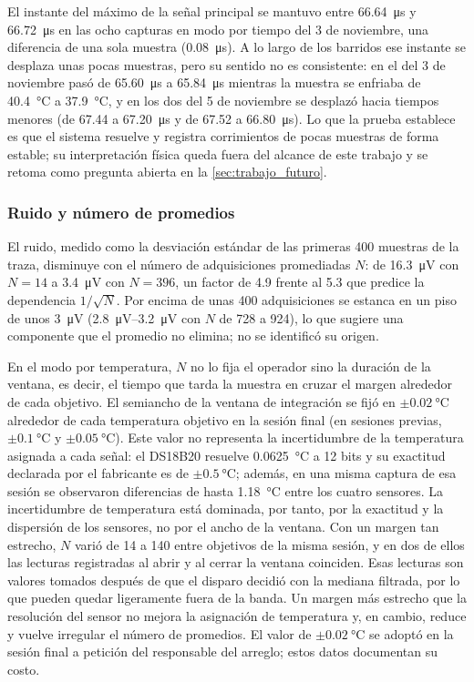 El instante del máximo de la señal principal se mantuvo entre
\SI{66.64}{\micro\second} y \SI{66.72}{\micro\second} en las ocho
capturas en modo por tiempo del 3 de noviembre, una diferencia de una
sola muestra (\SI{0.08}{\micro\second}). A lo largo de los barridos ese
instante se desplaza unas pocas muestras, pero su sentido no es
consistente: en el del 3 de noviembre pasó de \SI{65.60}{\micro\second}
a \SI{65.84}{\micro\second} mientras la muestra se enfriaba de
\SI{40.4}{\celsius} a \SI{37.9}{\celsius}, y en los dos del 5 de
noviembre se desplazó hacia tiempos menores (de \SI{67.44}{} a
\SI{67.20}{\micro\second} y de \SI{67.52}{} a
\SI{66.80}{\micro\second}). Lo que la prueba establece es que el sistema
resuelve y registra corrimientos de pocas muestras de forma estable; su
interpretación física queda fuera del alcance de este trabajo y se
retoma como pregunta abierta en la \cref{sec:trabajo_futuro}.

\subsubsection{Ruido y número de promedios}

El ruido, medido como la desviación estándar de las primeras 400
muestras de la traza, disminuye con el número de adquisiciones
promediadas $N$: de \SI{16.3}{\micro\volt} con $N = 14$ a
\SI{3.4}{\micro\volt} con $N = 396$, un factor de 4.9 frente al 5.3 que
predice la dependencia $1/\sqrt{N}$. Por encima de unas 400
adquisiciones se estanca en un piso de unos \SI{3}{\micro\volt}
(\SIrange{2.8}{3.2}{\micro\volt} con $N$ de 728 a 924), lo que sugiere
una componente que el promedio no elimina; no se identificó su origen.

En el modo por temperatura, $N$ no lo fija el operador sino la duración
de la ventana, es decir, el tiempo que tarda la muestra en cruzar el
margen alrededor de cada objetivo. El semiancho de la ventana de
integración se fijó en $\pm\SI{0.02}{\celsius}$ alrededor de cada
temperatura objetivo en la sesión final (en sesiones previas,
$\pm\SI{0.1}{\celsius}$ y $\pm\SI{0.05}{\celsius}$). Este valor no
representa la incertidumbre de la temperatura asignada a cada señal: el
DS18B20 resuelve \SI{0.0625}{\celsius} a 12 bits y su exactitud
declarada por el fabricante es de $\pm\SI{0.5}{\celsius}$; además, en
una misma captura de esa sesión se observaron diferencias de hasta
\SI{1.18}{\celsius} entre los cuatro sensores. La incertidumbre de
temperatura está dominada, por tanto, por la exactitud y la dispersión
de los sensores, no por el ancho de la ventana. Con un margen tan
estrecho, $N$ varió de 14 a 140 entre objetivos de la misma sesión, y
en dos de ellos las lecturas registradas al abrir y al cerrar la
ventana coinciden. Esas lecturas son valores tomados después de que el
disparo decidió con la mediana filtrada, por lo que pueden quedar
ligeramente fuera de la banda. Un margen más estrecho que la resolución
del sensor no mejora la asignación de temperatura y, en cambio, reduce
y vuelve irregular el número de promedios. El valor de
$\pm\SI{0.02}{\celsius}$ se adoptó en la sesión final a petición del
responsable del arreglo; estos datos documentan su costo.

